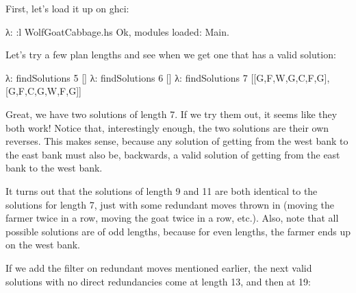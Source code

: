 \documentclass[]{article}
\newenvironment{Shaded}{}{}
\newcommand{\DataTypeTok}[1]{\textcolor[rgb]{0.56,0.13,0.00}{{#1}}}
\newcommand{\DecValTok}[1]{\textcolor[rgb]{0.25,0.63,0.44}{{#1}}}
\newcommand{\FunctionTok}[1]{\textcolor[rgb]{0.02,0.16,0.49}{{#1}}}
\newcommand{\NormalTok}[1]{{#1}}
\begin{document}
First, let's load it up on ghci:

\begin{Shaded}
\begin{Highlighting}[]
\NormalTok{λ}\FunctionTok{:} \FunctionTok{:}\NormalTok{l WolfGoatCabbage.hs}
\DataTypeTok{Ok}\NormalTok{, modules loaded}\FunctionTok{:} \DataTypeTok{Main}\FunctionTok{.}
\end{Highlighting}
\end{Shaded}

Let's try a few plan lengths and see when we get one that has a valid solution:

\begin{Shaded}
\begin{Highlighting}[]
\NormalTok{λ}\FunctionTok{:} \NormalTok{findSolutions }\DecValTok{5}
\NormalTok{[]}
\NormalTok{λ}\FunctionTok{:} \NormalTok{findSolutions }\DecValTok{6}
\NormalTok{[]}
\NormalTok{λ}\FunctionTok{:} \NormalTok{findSolutions }\DecValTok{7}
\NormalTok{[[}\DataTypeTok{G}\NormalTok{,}\DataTypeTok{F}\NormalTok{,}\DataTypeTok{W}\NormalTok{,}\DataTypeTok{G}\NormalTok{,}\DataTypeTok{C}\NormalTok{,}\DataTypeTok{F}\NormalTok{,}\DataTypeTok{G}\NormalTok{],[}\DataTypeTok{G}\NormalTok{,}\DataTypeTok{F}\NormalTok{,}\DataTypeTok{C}\NormalTok{,}\DataTypeTok{G}\NormalTok{,}\DataTypeTok{W}\NormalTok{,}\DataTypeTok{F}\NormalTok{,}\DataTypeTok{G}\NormalTok{]]}
\end{Highlighting}
\end{Shaded}

Great, we have two solutions of length 7. If we try them out, it seems like they
both work! Notice that, interestingly enough, the two solutions are their own
reverses. This makes sense, because any solution of getting from the west bank
to the east bank must also be, backwards, a valid solution of getting from the
east bank to the west bank.

It turns out that the solutions of length 9 and 11 are both identical to the
solutions for length 7, just with some redundant moves thrown in (moving the
farmer twice in a row, moving the goat twice in a row, etc.). Also, note that
all possible solutions are of odd lengths, because for even lengths, the farmer
ends up on the west bank.

If we add the filter on redundant moves mentioned earlier, the next valid
solutions with no direct redundancies come at length 13, and then at 19:
\end{document}
